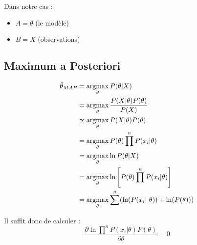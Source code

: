 \documentclass{article}
\begin{document}
Dans notre cas :
\begin{itemize}
    \item $A = \theta$ (le modèle)
    \item $B = X$ (observations)
\end{itemize}


\subsection{Maximum a Posteriori}

\begin{align*}
    \hat\theta_{MAP} & = \argmax\limits_{\theta} P(\theta | X) \\
    & = \argmax\limits_{\theta} \frac{P(X | \theta)P(\theta)}{P(X)} \\
    & \propto \argmax\limits_{\theta} P(X | \theta)P(\theta) \\
    & = \argmax\limits_{\theta} P(\theta) \prod\limits^n P(x_i | \theta) \\
    & = \argmax\limits_{\theta} \ln P(\theta | X) \\
    & = \argmax\limits_{\theta} \ln \Bigg[ P(\theta) \prod\limits^n P(x_i | \theta) \Bigg] \\
    & = \argmax\limits_{\theta} \sum\limits^n (\ln(P(x_i | \theta)) + \ln(P(\theta)))
\end{align*}

Il suffit donc de calculer : 
\begin{equation*}
    \frac{
        \partial \ln \prod\limits^n P(x_i | \theta)P(\theta)
    }{
        \partial \theta
    } = 0
\end{equation*}
\end{document}
